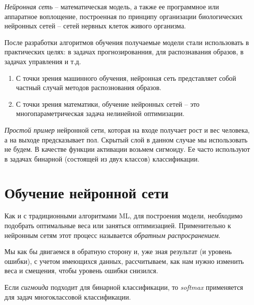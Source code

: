 
\begin{definition}
  \emph{Нейронная сеть} -- математическая модель, а также ее программное или аппаратное воплощение, построенная по принципу организации биологических нейронных сетей -- сетей нервных клеток живого организма.
\end{definition}

\begin{note}
  После разработки алгоритмов обучения получаемые модели стали использовать в практических целях: в задачах прогнозированния, для распознавания образов, в задачах управления и т.д.
\end{note}

\begin{enumerate}
  \item С точки зрения машинного обучения, нейронная сеть представляет собой частный случай методов распознования образов.
    \item С точки зрения математики, обучение нейронных сетей -- это многопараметрическая задача нелинейной оптимизации.
\end{enumerate}

\begin{eg}
  \emph{Простой пример} нейронной сети, которая на входе получает рост и вес человека, а на выходе предсказывает пол. Скрытый слой в данном случае мы использовать не будем. В качестве функции активации возьмем сигмоиду. Ее часто используют в задачах бинарной (состоящей из двух классов) классификации.
\end{eg}

\section{Обучение нейронной сети}

Как и с традиционными алгоритмами ML, для построения модели, необходимо подобрать оптимальные веса или заняться оптимизацией. Применительно к нейронным сетям этот процесс называется \emph{обратным распросранением}.

\begin{note}
  Мы как бы двигаемся в обратную сторону и, уже зная результат (и уровень ошибки), с учетом имеющихся данных, рассчитываем, как нам нужно изменить веса и смещения, чтобы уровень ошибки снизился.
\end{note}

Если \emph{сигмоида} подходит для бинарной классификации, то \emph{softmax} применяется для задач многоклассовой классификации.

